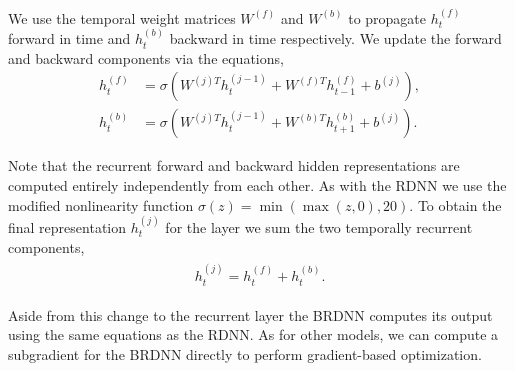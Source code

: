 We use the temporal weight matrices $W^{(f)}$ and $W^{(b)}$ to propagate
$h_t^{(f)}$ forward in time and $h_t^{(b)}$ backward in time respectively. We
update the forward and backward components via the equations,
\begin{align*}
    h^{(f)}_t &= \sigma(W^{(j)T} h^{(j-1)}_t +  W^{(f)T} h^{(f)}_{t-1} + b^{(j)}), \\
    h^{(b)}_t &= \sigma(W^{(j)T} h^{(j-1)}_t +  W^{(b)T} h^{(b)}_{t+1} + b^{(j)}).
\end{align*}

Note that the recurrent forward and backward hidden representations are
computed entirely independently from each other. As with the RDNN we use the
modified nonlinearity function $\sigma(z) = \min( \max (z,0), 20)$. To obtain
the final representation $h^{(j)}_t$ for the layer we sum the two temporally
recurrent components,
\begin{align}
\begin{split}
  h^{(j)}_t = h^{(f)}_t + h^{(b)}_t.
\end{split}
\end{align}

Aside from this change to the recurrent layer the BRDNN computes its output
using the same equations as the RDNN. As for other models, we can compute a
subgradient for the BRDNN directly to perform gradient-based optimization.
